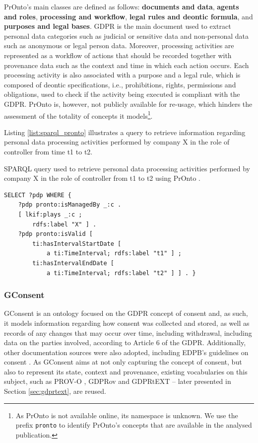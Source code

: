 PrOnto's main classes are defined as follows: \textbf{documents and data}, \textbf{agents and roles}, \textbf{processing and workflow}, \textbf{legal rules and deontic formula}, and \textbf{purposes and legal bases}.
GDPR is the main document used to extract personal data categories such as judicial or sensitive data and non-personal data such as anonymous or legal person data.
Moreover, processing activities are represented as a workflow of actions that should be recorded together with provenance data such as the context and time in which each action occurs.
Each processing activity is also associated with a purpose and a legal rule, which is composed of deontic specifications, i.e., prohibitions, rights, permissions and obligations, used to check if the activity being executed is compliant with the GDPR. PrOnto is, however, not publicly available for re-usage, which hinders the assessment of the totality of concepts it models\footnote{As PrOnto is not available online, its namespace is unknown. We use the prefix \texttt{pronto} to identify PrOnto's concepts that are available in the analysed publication.}. 

Listing \ref{list:sparql_pronto} illustrates a query to retrieve information regarding personal data processing activities performed by company X in the role of controller from time t1 to t2.

\begin{listing}
\caption{SPARQL query used to retrieve personal data processing activities performed by company X in the role of controller from t1 to t2 using PrOnto \citep{ko_pronto_2018}.}
\label{list:sparql_pronto}
\begin{verbatim}
SELECT ?pdp WHERE {
    ?pdp pronto:isManagedBy _:c .
    [ lkif:plays _:c ;
        rdfs:label "X" ] .
    ?pdp pronto:isValid [
        ti:hasIntervalStartDate [ 
            a ti:TimeInterval; rdfs:label "t1" ] ;
        ti:hasIntervalEndDate [ 
            a ti:TimeInterval; rdfs:label "t2" ] ] . }
\end{verbatim}
\end{listing}

\subsubsection{GConsent}
\label{sec:gconsent}

GConsent \citep{hitzler_gconsent_2019} is an ontology focused on the GDPR concept of consent and, as such, it models information regarding how consent was collected and stored, as well as records of any changes that may occur over time, including withdrawal, including data on the parties involved, according to Article 6 of the GDPR.
Additionally, other documentation sources were also adopted, including EDPB's guidelines on consent \citep{european_data_protection_board_guidelines_2020}.
As GConsent aims at not only capturing the concept of consent, but also to represent its state, context and provenance, existing vocabularies on this subject, such as PROV-O \citep{lebo_prov-o_2013}, GDPRov \citep{pandit_modelling_2017} and GDPRtEXT \citep{gangemi_gdprtext_2018} -- later presented in Section \ref{sec:gdprtext}, are reused. %

